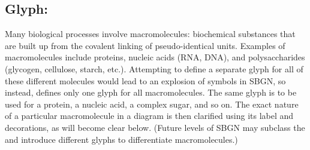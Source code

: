 
\color{red}

\subsection{Glyph: }
\label{sec:macromolecule}

Many biological processes involve macromolecules: biochemical substances that are built up from the covalent linking of pseudo-identical units. Examples of macromolecules include proteins, nucleic acids (RNA, DNA), and polysaccharides (glycogen, cellulose, starch, etc.).  Attempting to define a separate glyph for all of these different molecules would lead to an explosion of symbols in SBGN, so instead, \SBGNERLone defines only one glyph for all macromolecules.  The same glyph is to be used for a protein, a nucleic acid, a complex sugar, and so on.  The exact nature of a particular macromolecule in a diagram is then clarified using its label and decorations, as will become clear below.  (Future levels of SBGN may subclass the  and introduce different glyphs to differentiate macromolecules.)

